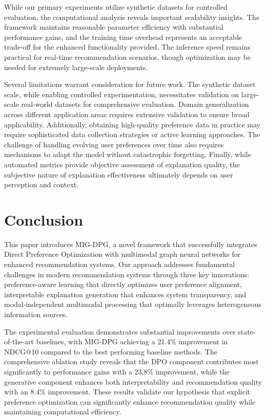 \documentclass[pdflatex,sn-mathphys-num]{sn-jnl}%
\theoremstyle{thmstyleone}%
\theoremstyle{thmstyletwo}%
\theoremstyle{thmstylethree}%
\begin{document}
While our primary experiments utilize synthetic datasets for controlled evaluation, the computational analysis reveals important scalability insights. The framework maintains reasonable parameter efficiency with substantial performance gains, and the training time overhead represents an acceptable trade-off for the enhanced functionality provided. The inference speed remains practical for real-time recommendation scenarios, though optimization may be needed for extremely large-scale deployments.

Several limitations warrant consideration for future work. The synthetic dataset scale, while enabling controlled experimentation, necessitates validation on large-scale real-world datasets for comprehensive evaluation. Domain generalization across different application areas requires extensive validation to ensure broad applicability. Additionally, obtaining high-quality preference data in practice may require sophisticated data collection strategies or active learning approaches. The challenge of handling evolving user preferences over time also requires mechanisms to adapt the model without catastrophic forgetting. Finally, while automated metrics provide objective assessment of explanation quality, the subjective nature of explanation effectiveness ultimately depends on user perception and context.

\section{Conclusion}\label{sec:conclusion}

This paper introduces MIG-DPG, a novel framework that successfully integrates Direct Preference Optimization with multimodal graph neural networks for enhanced recommendation systems. Our approach addresses fundamental challenges in modern recommendation systems through three key innovations: preference-aware learning that directly optimizes user preference alignment, interpretable explanation generation that enhances system transparency, and modal-independent multimodal processing that optimally leverages heterogeneous information sources.

The experimental evaluation demonstrates substantial improvements over state-of-the-art baselines, with MIG-DPG achieving a 21.4\% improvement in NDCG@10 compared to the best performing baseline methods. The comprehensive ablation study reveals that the DPO component contributes most significantly to performance gains with a 23.8\% improvement, while the generative component enhances both interpretability and recommendation quality with an 8.4\% improvement. These results validate our hypothesis that explicit preference optimization can significantly enhance recommendation quality while maintaining computational efficiency.
\end{document}
